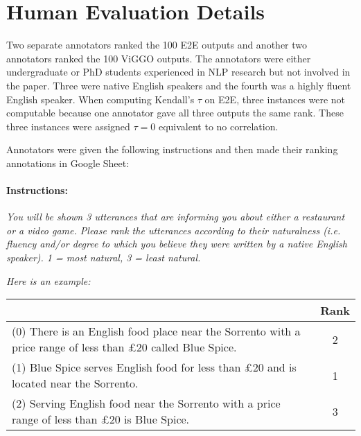 
\section{Human Evaluation Details}
\label{app:humaneval}

Two separate annotators ranked the 100
E2E outputs and another two annotators ranked the 100 ViGGO outputs.
The annotators were either undergraduate or PhD students experienced in
NLP research but not involved in the paper. Three were native English 
speakers and the fourth was a highly fluent English speaker.
When computing Kendall's $\tau$ on E2E, three instances were not computable
because one annotator gave all three outputs the same rank. These 
three instances were assigned $\tau=0$ equivalent to no correlation.


Annotators were given the following instructions and then made their 
ranking annotations in Google Sheet:




\paragraph{Instructions:} \textit{You will be shown 3 utterances that are 
informing you about either a restaurant or a video game. 
Please rank the utterances according to their naturalness
(i.e. fluency and/or degree to which you believe they were written by a native English speaker). 1 = most natural, 3 = least natural.}


\textit{Here is an example:}\\




\begin{centering}
\begin{tabular}{p{5.4cm} c}
\toprule
   &  Rank\\
   \midrule
    (0) There is an English food place near the Sorrento with a price range of less than \pounds20 called Blue Spice. & 2 \\
    \midrule
    (1) Blue Spice serves English food for less than \pounds20 and is located near the Sorrento. &  1 \\
    \midrule
    (2) Serving English food near the Sorrento with a price range of less than \pounds20 is Blue Spice.  & 3\\
    \bottomrule
\end{tabular}


\end{centering}

~\\

